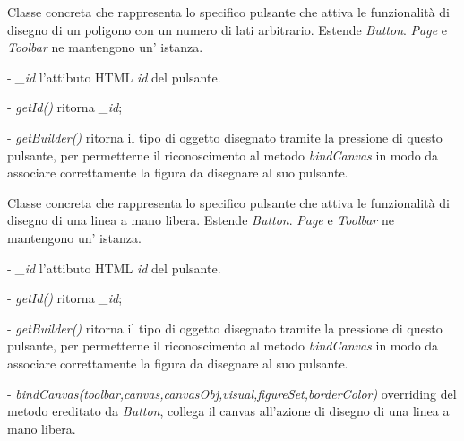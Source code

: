 Classe concreta che rappresenta lo specifico pulsante che attiva le funzionalit\` a di disegno di un poligono con un numero di lati arbitrario.
Estende \textit{Button}.
\textit{Page} e \textit{Toolbar} ne mantengono un' istanza.
\begin{elencopuntato}[\subsubsecindent]
\item[-] \textit{{\_}id} l'attibuto HTML \textit{id} del pulsante.
\end{elencopuntato}
\begin{elencopuntato}[\subsubsecindent]
\item[-] \textit{getId()} ritorna \textit{{\_}id};
\item[-] \textit{getBuilder()} ritorna il tipo di oggetto disegnato tramite la pressione di questo pulsante, per permetterne il riconoscimento al metodo \textit{bindCanvas} in modo da associare correttamente la figura da disegnare al suo pulsante.
\end{elencopuntato}

Classe concreta che rappresenta lo specifico pulsante che attiva le funzionalit\` a di disegno di una linea a mano libera.
Estende \textit{Button}.
\textit{Page} e \textit{Toolbar} ne mantengono un' istanza.
\begin{elencopuntato}[\subsubsecindent]
\item[-] \textit{{\_}id} l'attibuto HTML \textit{id} del pulsante.
\end{elencopuntato}
\begin{elencopuntato}[\subsubsecindent]
\item[-] \textit{getId()} ritorna \textit{{\_}id};
\item[-] \textit{getBuilder()} ritorna il tipo di oggetto disegnato tramite la pressione di questo pulsante, per permetterne il riconoscimento al metodo \textit{bindCanvas} in modo da associare correttamente la figura da disegnare al suo pulsante.
\item[-]  \textit{bindCanvas(toolbar,canvas,canvasObj,visual,figureSet,borderColor)} overriding del metodo ereditato da \textit{Button}, collega il canvas all'azione di disegno di una linea a mano libera.
\end{elencopuntato}

